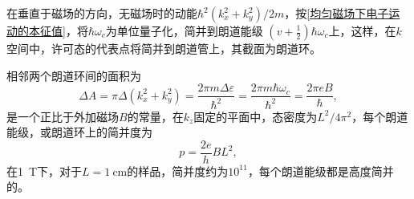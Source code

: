             在垂直于磁场的方向，无磁场时的动能$\hbar^2(k_x^2+k_y^2)/2m$，按\autoref{均匀磁场下电子运动的本征值}，将$\hbar\omega_c$为单位量子化，简并到朗道能级
            $\left( v+\frac{1}{2} \right)\hbar\omega_c$上，这样，在$k$空间中，许可态的代表点将简并到朗道管上，其截面为朗道环。

            相邻两个朗道环间的面积为
            \begin{equation}
                \Delta A =\pi\Delta(k_x^2+k_y^2)=\frac{2\pi m\Delta\varepsilon}{\hbar^2}=\frac{2\pi m\hbar\omega_c}{\hbar^2}=\frac{2\pi eB}{\hbar},
            \end{equation}
            是一个正比于外加磁场$B$的常量，在$k_z$固定的平面中，态密度为$L^2/4\pi^2$，每个朗道能级，或朗道环上的简并度为
            \begin{equation}
                p=\frac{2e}{h}BL^2,
            \end{equation}
            在\SI{1}{\tesla}下，对于$L=\SI{1}{\cm}$的样品，简并度约为$10^{11}$，每个朗道能级都是高度简并的。
